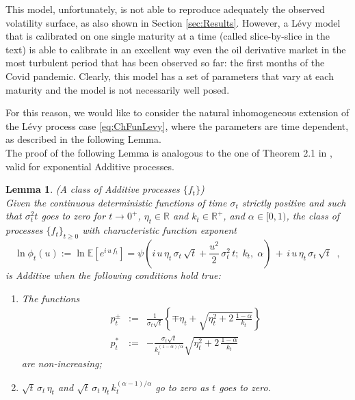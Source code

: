 \documentclass[12pt]{article}
\newtheorem{lemma}[theorem]{Lemma}
\theoremstyle{definition}
\theoremstyle{remark}
\numberwithin{theorem}{section}
\numberwithin{proposition}{section}
\numberwithin{lemma}{section}
\numberwithin{corollary}{section}
\numberwithin{definition}{section}
\numberwithin{remark}{section}
\numberwithin{example}{section}
\newcommand{\R}{\mathbb{R}}
\begin{document}
This model, unfortunately, is not able to reproduce adequately the observed volatility surface, as also shown in Section \ref{sec:Results}.
However, a L\'evy model that is calibrated on one single maturity at a time (called slice-by-slice in the text) is able to calibrate in an excellent way
even the oil derivative market in the most turbulent period  that has been observed so far: %
 the first months of the Covid pandemic.
Clearly, this model has a set of parameters that vary at each maturity and the model is not necessarily well posed.

For this reason, we would like to consider the natural inhomogeneous extension of the L\'evy process case \eqref{eq:ChFunLevy}, where the parameters are time dependent, as described in the following Lemma.\\
The proof of the following Lemma is analogous to the one of Theorem 2.1 in \citet[][Thm.2.1]{ATS}, valid for exponential Additive processes.
{
\renewcommand{\thelemma}{A.\arabic{lemma}}
\begin{lemma}{\rm (A class of Additive processes $\{ f_t \}$)} 
\label{lem:f_AdditiveGen}\\
Given the continuous deterministic functions of time $\sigma_t$ strictly positive and such that $\sigma_t^2t$ goes to zero for $t\rightarrow0^+$, $\eta_t \in \R$ and $k_t \in \R^+$, and $\alpha\in [0,1)$,
the class of processes $\{ f_t \}_{t\ge 0}$ with characteristic function exponent
\begin{equation}
\label{eq:ChFunGeneral}
	\ln \phi_t(u):= \ln \mathbb{E}\left[e^{ i \, u \, f_t}\right]=\psi\left(i \, u \, \eta_t \, {\sigma }_t  \, \sqrt{t}   
+\frac{u^2 }{2} \, {\sigma }_t^2 \, t ; \; k_t, \; \alpha \right) \, + \,
 i\, u \, \eta_t \, {\sigma }_t \, \sqrt{t}     \;\;,
\end{equation}
is Additive when the following conditions hold true: 	
\begin{enumerate}
\item The functions  
\[
\begin{array}{lcl}
p^\pm_t  &:=& \displaystyle \frac{1}{\sigma_t \sqrt{t}} \left\{ \displaystyle \mp \eta_t + \sqrt{\eta_t^2+2 \, \frac{1-\alpha}{k_t} }  \right\}\\[3mm]
p^*_t      &:=& \displaystyle -\frac{\sigma_t\sqrt{t}}{k_t^{(1-\alpha)/\alpha}}\sqrt{\eta_t^2+ 2\,\frac{1-\alpha}{ k_t}}\;\;
\end{array}
\]
are non-increasing;
\item \(\displaystyle \sqrt{t} \,\sigma_t\, \eta_t \) and \(\displaystyle \sqrt{t}\,\sigma_t \, \eta_t \, {k_t^{(\alpha -1)/\alpha}} \) go to zero as $t$ goes to zero.
\end{enumerate}
\end{lemma}
}
\end{document}
